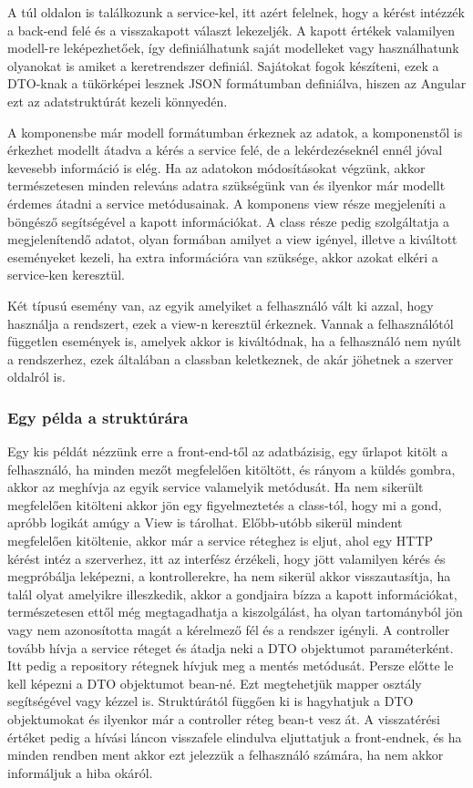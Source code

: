A túl oldalon is találkozunk a service-kel, itt azért felelnek, hogy a kérést intézzék a back-end felé és a visszakapott választ lekezeljék. A kapott értékek valamilyen modell-re leképezhetőek, így definiálhatunk saját modelleket vagy használhatunk olyanokat is amiket a keretrendszer definiál. Sajátokat fogok készíteni, ezek a DTO-knak a tükörképei lesznek JSON formátumban definiálva, hiszen az Angular ezt az adatstruktúrát kezeli könnyedén. 

A komponensbe már modell formátumban érkeznek az adatok, a komponenstől is érkezhet modellt átadva a kérés a service felé, de a lekérdezéseknél ennél jóval kevesebb információ is elég. Ha az adatokon módosításokat végzünk, akkor természetesen minden releváns adatra szükségünk van és ilyenkor már modellt érdemes átadni a service metódusainak.
A komponens view része megjeleníti a böngésző segítségével a kapott információkat. A class része pedig szolgáltatja a megjelenítendő adatot, olyan formában amilyet a view igényel, illetve a kiváltott eseményeket kezeli, ha extra információra van szüksége, akkor azokat elkéri a service-ken keresztül.

Két típusú esemény van, az egyik amelyiket a felhasználó vált ki azzal, hogy használja a rendszert, ezek a view-n keresztül érkeznek. Vannak a felhasználótól független események is, amelyek akkor is kiváltódnak, ha a felhasználó nem nyúlt a rendszerhez, ezek általában a classban keletkeznek, de akár jöhetnek a  szerver oldalról is.

\subsubsection{Egy példa a struktúrára}

Egy kis példát nézzünk erre a front-end-től az adatbázisig, egy űrlapot kitölt a felhasználó, ha minden mezőt megfelelően kitöltött, és rányom a küldés gombra, akkor az meghívja az egyik service valamelyik metódusát. Ha nem sikerült megfelelően kitölteni akkor jön egy figyelmeztetés a class-tól, hogy mi a gond, apróbb logikát amúgy a View is tárolhat. Előbb-utóbb sikerül mindent megfelelően kitöltenie, akkor már a service réteghez is eljut, ahol egy HTTP kérést intéz a szerverhez, itt az interfész érzékeli, hogy jött valamilyen kérés és megpróbálja leképezni, a kontrollerekre, ha nem sikerül akkor visszautasítja, ha talál olyat amelyikre illeszkedik, akkor a gondjaira bízza a kapott információkat, természetesen ettől még megtagadhatja a kiszolgálást, ha olyan tartományból jön vagy nem azonosította magát a kérelmező fél és a rendszer igényli. A controller tovább hívja a service réteget és átadja neki a DTO objektumot paraméterként. Itt pedig a repository rétegnek hívjuk meg a mentés metódusát. Persze előtte le kell képezni a DTO objektumot bean-né. Ezt megtehetjük mapper osztály segítségével vagy kézzel is. Struktúrától függően ki is hagyhatjuk a DTO objektumokat és ilyenkor már a controller réteg bean-t vesz át. A visszatérési értéket pedig a hívási láncon visszafele elindulva eljuttatjuk a front-endnek, és ha minden rendben ment akkor ezt jelezzük a felhasználó számára, ha nem akkor informáljuk a hiba okáról. 
 
